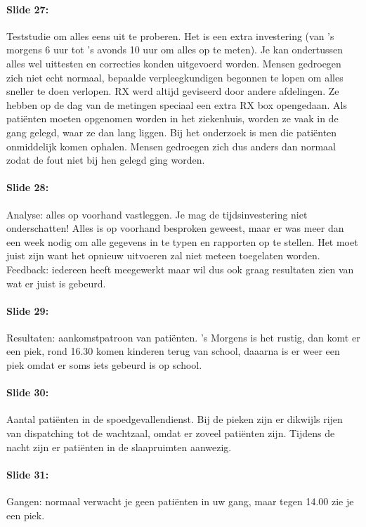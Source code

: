 \documentclass[10pt,a4paper]{report}
\begin{document}
\paragraph{Slide 27:} Teststudie om alles eens uit te proberen. Het is een extra investering (van 's morgens 6 uur tot 's avonds 10 uur om alles op te meten). Je kan ondertussen alles wel uittesten en correcties konden uitgevoerd worden. Mensen gedroegen zich niet echt normaal, bepaalde verpleegkundigen begonnen te lopen om alles sneller te doen verlopen. RX werd altijd geviseerd door andere afdelingen. Ze hebben op de dag van de metingen speciaal een extra RX box opengedaan. Als pati\"enten moeten opgenomen worden in het ziekenhuis, worden ze vaak in de gang gelegd, waar ze dan lang liggen. Bij het onderzoek is men die pati\"enten onmiddelijk komen ophalen. Mensen gedroegen zich dus anders dan normaal zodat de fout niet bij hen gelegd ging worden. 

\paragraph{Slide 28:} Analyse: alles op voorhand vastleggen. Je mag de tijdsinvestering niet onderschatten! Alles is op voorhand besproken geweest, maar er was meer dan een week nodig om alle gegevens in te typen en rapporten op te stellen. Het moet juist zijn want het opnieuw uitvoeren zal niet meteen toegelaten worden.\\
Feedback: iedereen heeft meegewerkt maar wil dus ook graag resultaten zien van wat er juist is gebeurd.

\paragraph{Slide 29:} Resultaten: aankomstpatroon van pati\"enten. 's Morgens is het rustig, dan komt er een piek, rond 16.30 komen kinderen terug van school, daaarna is er weer een piek omdat er soms iets gebeurd is op school.

\paragraph{Slide 30:} Aantal pati\"enten in de spoedgevallendienst. Bij de pieken zijn er dikwijls rijen van dispatching tot de wachtzaal, omdat er zoveel pati\"enten zijn. Tijdens de nacht zijn er pati\"enten in de slaapruimten aanwezig.

\paragraph{Slide 31:} Gangen: normaal verwacht je geen pati\"enten in uw gang, maar tegen 14.00 zie je een piek.
\end{document}
